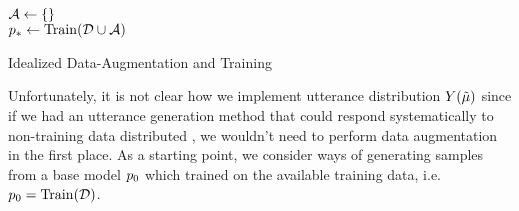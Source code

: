 %





\begin{algorithm}[t]
${\mathcal{A}} \gets \{\}$\\
\While{$\setsize{\augdata} < \numSamples$}{
$\tilde{\mr} \sim \daMrDist$ \\
$\boldsymbol{\tilde{\utttoks}} \sim \daUttDist(\boldsymbol{\tilde{\mr}})$\\
$\augdata \gets \augdata \cup \{(\tilde{\mr}, \boldsymbol{\tilde{\utttoks}}) \}$
}
$p_* \gets \operatorname{Train}(\mathcal{D} \cup {\ensuremath{\mathcal{A}}})$\\
\KwResult{$\gen_*$}
    \caption{Idealized Data-Augmentation and Training}
\label{alg:idealda}
\end{algorithm}


Unfortunately, it is not clear how we implement utterance distribution
$Y(\tilde{\mu})$ since if we had an utterance generation method that could
respond systematically to non-training data distributed \meaningrepresentations, we wouldn't need to perform data augmentation in the first place. As a starting point, 
we consider ways of generating samples from a base model $p_0$ which 
trained on the available training data, i.e. $p_0 = \operatorname{Train}(\mathcal{D})$.


